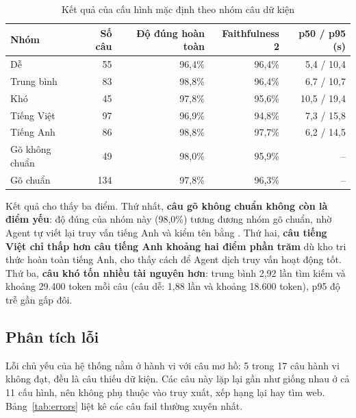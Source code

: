 \begin{table}[H]
    \centering
    \caption{Kết quả của cấu hình mặc định theo nhóm câu dữ kiện}
    \label{tab:group_results}
    \small
    \begin{tabular}{|l|r|r|r|r|}
        \toprule
        \textbf{Nhóm} & \textbf{Số câu} & \textbf{Độ đúng hoàn toàn} & \textbf{Faithfulness 2} & \textbf{p50 / p95 (s)} \\
        \midrule
        Dễ & 55 & 96,4\% & 96,4\% & 5,4 / 10,4 \\ \hline
        Trung bình & 83 & 98,8\% & 96,4\% & 6,7 / 10,7 \\ \hline
        Khó & 45 & 97,8\% & 95,6\% & 10,5 / 19,4 \\ \hline
        Tiếng Việt & 97 & 96,9\% & 94,8\% & 7,3 / 15,8 \\ \hline
        Tiếng Anh & 86 & 98,8\% & 97,7\% & 6,2 / 14,5 \\ \hline
        Gõ không chuẩn & 49 & 98,0\% & 95,9\% & -- \\ \hline
        Gõ chuẩn & 134 & 97,8\% & 96,3\% & -- \\
        \bottomrule
    \end{tabular}
\end{table}

Kết quả cho thấy ba điểm. Thứ nhất, \textbf{câu gõ không chuẩn không còn là điểm yếu}: độ đúng của nhóm này (98,0\%) tương đương nhóm gõ chuẩn, nhờ Agent tự viết lại truy vấn tiếng Anh và kiểm tên bằng . Thứ hai, \textbf{câu tiếng Việt chỉ thấp hơn câu tiếng Anh khoảng hai điểm phần trăm} dù kho tri thức hoàn toàn tiếng Anh, cho thấy cách để Agent dịch truy vấn hoạt động tốt. Thứ ba, \textbf{câu khó tốn nhiều tài nguyên hơn}: trung bình 2,92 lần tìm kiếm và khoảng 29.400 token mỗi câu (câu dễ: 1,88 lần và khoảng 18.600 token), p95 độ trễ gần gấp đôi.

\subsection{Phân tích lỗi}
\label{sec:error_analysis}

Lỗi chủ yếu của hệ thống nằm ở hành vi với câu mơ hồ: 5 trong 17 câu hành vi không đạt, đều là câu thiếu dữ kiện. Các câu này lặp lại gần như giống nhau ở cả 11 cấu hình, nên không phụ thuộc vào truy xuất, xếp hạng lại hay tìm web. Bảng~\ref{tab:errors} liệt kê các câu fail thường xuyên nhất.

